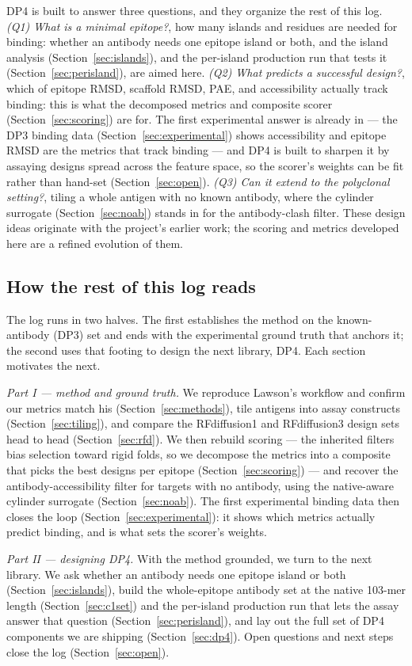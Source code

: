 \noindent
DP4 is built to answer three questions, and they organize the rest of this log.
\emph{(Q1) What is a minimal epitope?}, how many islands and residues are needed for binding:
whether an antibody needs one epitope island or both, and the island analysis
(Section~\ref{sec:islands}), and the per-island production run that tests it
(Section~\ref{sec:perisland}), are aimed here. \emph{(Q2) What predicts a successful design?},
which of epitope RMSD, scaffold RMSD, PAE, and accessibility actually track binding: this is what
the decomposed metrics and composite scorer (Section~\ref{sec:scoring}) are for. The first
experimental answer is already in --- the DP3 binding data (Section~\ref{sec:experimental}) shows
accessibility and epitope RMSD are the metrics that track binding --- and DP4 is built to sharpen
it by assaying designs spread across the feature space, so the scorer's weights can be fit rather
than hand-set (Section~\ref{sec:open}). \emph{(Q3) Can it extend to the polyclonal setting?},
tiling a whole antigen with no known antibody, where the cylinder surrogate
(Section~\ref{sec:noab}) stands in for the antibody-clash filter. These design ideas
originate with the project's earlier work; the scoring and metrics developed here are a refined
evolution of them.

\subsection{How the rest of this log reads}
The log runs in two halves. The first establishes the method on the known-antibody (DP3) set and
ends with the experimental ground truth that anchors it; the second uses that footing to design
the next library, DP4. Each section motivates the next.

\emph{Part I --- method and ground truth.} We reproduce Lawson's workflow and confirm our metrics
match his (Section~\ref{sec:methods}), tile antigens into assay constructs
(Section~\ref{sec:tiling}), and compare the RFdiffusion1 and RFdiffusion3 design sets head to head
(Section~\ref{sec:rfd}). We then rebuild scoring --- the inherited filters bias selection toward
rigid folds, so we decompose the metrics into a composite that picks the best designs per epitope
(Section~\ref{sec:scoring}) --- and recover the antibody-accessibility filter for targets with no
antibody, using the native-aware cylinder surrogate (Section~\ref{sec:noab}). The first
experimental binding data then closes the loop (Section~\ref{sec:experimental}): it shows which
metrics actually predict binding, and is what sets the scorer's weights.

\emph{Part II --- designing DP4.} With the method grounded, we turn to the next library. We ask
whether an antibody needs one epitope island or both (Section~\ref{sec:islands}), build the
whole-epitope antibody set at the native 103-mer length (Section~\ref{sec:c1set}) and the per-island
production run that lets the assay answer that question (Section~\ref{sec:perisland}), and lay out
the full set of DP4 components we are shipping (Section~\ref{sec:dp4}). Open questions and next
steps close the log (Section~\ref{sec:open}).
